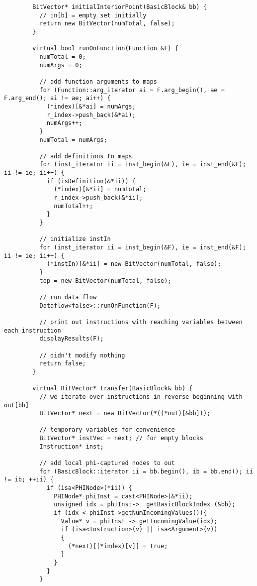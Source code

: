 \documentclass[12pt]{article}
\begin{document}
\begin{verbatim}
        BitVector* initialInteriorPoint(BasicBlock& bb) {
          // in[b] = empty set initially
          return new BitVector(numTotal, false);
        }

        virtual bool runOnFunction(Function &F) {
          numTotal = 0;
          numArgs = 0;
          
          // add function arguments to maps
          for (Function::arg_iterator ai = F.arg_begin(), ae = F.arg_end(); ai != ae; ai++) {
            (*index)[&*ai] = numArgs;
            r_index->push_back(&*ai);
            numArgs++;
          }
          numTotal = numArgs; 
          
          // add definitions to maps
          for (inst_iterator ii = inst_begin(&F), ie = inst_end(&F); ii != ie; ii++) {
            if (isDefinition(&*ii)) {
              (*index)[&*ii] = numTotal;
              r_index->push_back(&*ii);
              numTotal++;
            }
          }
          
          // initialize instIn
          for (inst_iterator ii = inst_begin(&F), ie = inst_end(&F); ii != ie; ii++) {
            (*instIn)[&*ii] = new BitVector(numTotal, false);
          }
          top = new BitVector(numTotal, false);
          
          // run data flow 
          Dataflow<false>::runOnFunction(F);
         
          // print out instructions with reaching variables between each instruction 
          displayResults(F);
          
          // didn't modify nothing 
          return false;
        }
        
        virtual BitVector* transfer(BasicBlock& bb) {
          // we iterate over instructions in reverse beginning with out[bb]
          BitVector* next = new BitVector(*((*out)[&bb]));
          
          // temporary variables for convenience
          BitVector* instVec = next; // for empty blocks
          Instruction* inst;

          // add local phi-captured nodes to out          
          for (BasicBlock::iterator ii = bb.begin(), ib = bb.end(); ii != ib; ++ii) {
            if (isa<PHINode>(*ii)) {
              PHINode* phiInst = cast<PHINode>(&*ii);
              unsigned idx = phiInst->  getBasicBlockIndex (&bb);
              if (idx < phiInst->getNumIncomingValues()){
                Value* v = phiInst -> getIncomingValue(idx);
                if (isa<Instruction>(v) || isa<Argument>(v))
                {
                  (*next)[(*index)[v]] = true;
                }
              }
            }
          }


\end{verbatim}
\end{document}
